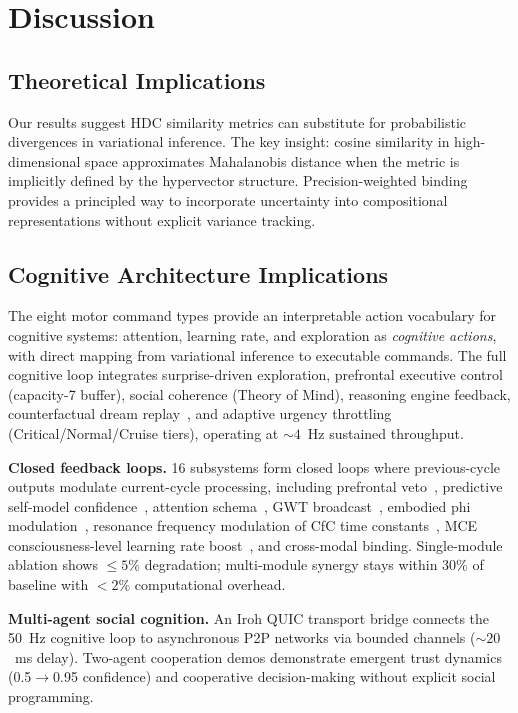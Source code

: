 \documentclass[10pt,letterpaper]{article}
\begin{document}
\section{Discussion}

\subsection{Theoretical Implications}

Our results suggest HDC similarity metrics can substitute for probabilistic divergences in variational inference. The key insight: cosine similarity in high-dimensional space approximates Mahalanobis distance when the metric is implicitly defined by the hypervector structure. Precision-weighted binding provides a principled way to incorporate uncertainty into compositional representations without explicit variance tracking.

\subsection{Cognitive Architecture Implications}

The eight motor command types provide an interpretable action vocabulary for cognitive systems: attention, learning rate, and exploration as \emph{cognitive actions}, with direct mapping from variational inference to executable commands. The full cognitive loop integrates surprise-driven exploration, prefrontal executive control (capacity-7 buffer), social coherence (Theory of Mind), reasoning engine feedback, counterfactual dream replay~\cite{diekelmann2010memory}, and adaptive urgency throttling (Critical/Normal/Cruise tiers), operating at ${\sim}4$~Hz sustained throughput.

\textbf{Closed feedback loops.} 16 subsystems form closed loops where previous-cycle outputs modulate current-cycle processing, including prefrontal veto~\cite{miller2001integrative}, predictive self-model confidence~\cite{clark2013whatever}, attention schema~\cite{graziano2013consciousness}, GWT broadcast~\cite{baars1988cognitive}, embodied phi modulation~\cite{damasio1999feeling}, resonance frequency modulation of CfC time constants~\cite{buzsaki2006rhythms}, MCE consciousness-level learning rate boost~\cite{dehaene2014consciousness}, and cross-modal binding. Single-module ablation shows $\leq 5\%$ degradation; multi-module synergy stays within $30\%$ of baseline with $<2\%$ computational overhead.

\textbf{Multi-agent social cognition.} An Iroh QUIC transport bridge connects the 50~Hz cognitive loop to asynchronous P2P networks via bounded channels (${\sim}20$~ms delay). Two-agent cooperation demos demonstrate emergent trust dynamics (0.5$\to$0.95 confidence) and cooperative decision-making without explicit social programming.
\end{document}
